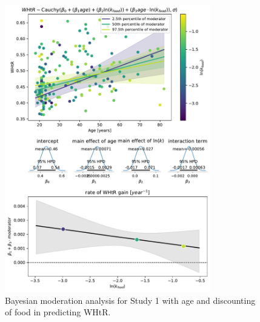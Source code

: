 \documentclass[12pt, a4paper]{article}
\begin{document}
\begin{figure} 
	\centering
	\includegraphics[width=0.8\textwidth]{analysis/study1 whtr~age*food.pdf} 
	\caption{Bayesian moderation analysis for Study 1 with age and discounting of food in predicting WHtR.}
	\label{fig:s1_whtr_food}
\end{figure}

 
\end{document}
